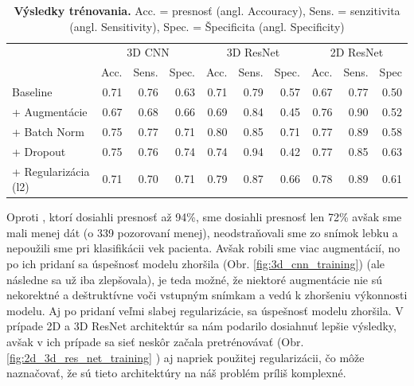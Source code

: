 \begin{landscape}
    \begin{table}[]
        \centering
        \begin{tabular}{l|rrr|rrr|rrr|}
            \cline{2-10}
            \multirow{2}{*}{}    & \multicolumn{3}{c|}{3D CNN} & \multicolumn{3}{c|}{3D ResNet} & \multicolumn{3}{c|}{2D ResNet} \\ \cline{2-10} 
            &
            \multicolumn{1}{c|}{Acc.} &
            \multicolumn{1}{c|}{Sens.} &
            \multicolumn{1}{c|}{Spec.} &
            \multicolumn{1}{c|}{Acc.} &
            \multicolumn{1}{c|}{Sens.} &
            \multicolumn{1}{c|}{Spec.} &
            \multicolumn{1}{c|}{Acc.} &
            \multicolumn{1}{c|}{Sens.} &
            \multicolumn{1}{c|}{Spec} \\ \hline
            \multicolumn{1}{|l|}{Baseline}             & 0.71    & 0.76    & 0.63    & 0.71     & 0.79     & 0.57     & 0.67     & 0.77     & 0.50     \\
            \multicolumn{1}{|l|}{+ Augmentácie}        & 0.67    & 0.68    & 0.66    & 0.69     & 0.84     & 0.45     & 0.76     & 0.90     & 0.52     \\
            \multicolumn{1}{|l|}{+ Batch Norm}         & 0.75    & 0.77    & 0.71    & 0.80     & 0.85     & 0.71     & 0.77     & 0.89     & 0.58     \\
            \multicolumn{1}{|l|}{+ Dropout}            & 0.75    & 0.76    & 0.74    & 0.74     & 0.94     & 0.42     & 0.77     & 0.85     & 0.63     \\
            \multicolumn{1}{|l|}{+ Regularizácia (l2)} & 0.71    & 0.70    & 0.71    & 0.79     & 0.87     & 0.66     & 0.78     & 0.89     & 0.61    
        \end{tabular}
        \caption{\textbf{Výsledky trénovania.} Acc. = presnosť (angl. Accouracy), Sens. = senzitivita (angl. Sensitivity), Spec. = Špecificita (angl. Specificity)}
        \label{tab:model_training_results}
    \end{table}
\end{landscape}

Oproti \citeauthor*{esmaeilzadeh2018end}, ktorí dosiahli presnosť až 94\%, sme dosiahli presnosť len 72\% avšak sme mali menej dát (o 339 pozorovaní menej), neodstraňovali sme zo snímok lebku a nepoužili sme pri klasifikácii vek pacienta. Avšak robili sme viac augmentácií, no po ich pridaní sa úspešnosť modelu zhoršila (Obr. \ref{fig:3d_cnn_training}) (ale následne sa už iba zlepšovala), je teda možné, že niektoré augmentácie nie sú nekorektné a deštruktívne voči vstupným snímkam a vedú k zhoršeniu výkonnosti modelu. Aj po pridaní veľmi slabej regularizácie, sa úspešnosť modelu zhoršila. V prípade 2D a 3D ResNet architektúr sa nám podarilo dosiahnuť lepšie výsledky, avšak v ich prípade sa sieť neskôr začala pretrénovávať (Obr. \ref{fig:2d_3d_res_net_training}
) aj napriek použitej regularizácii, čo môže naznačovať, že sú tieto architektúry na náš problém príliš komplexné.

